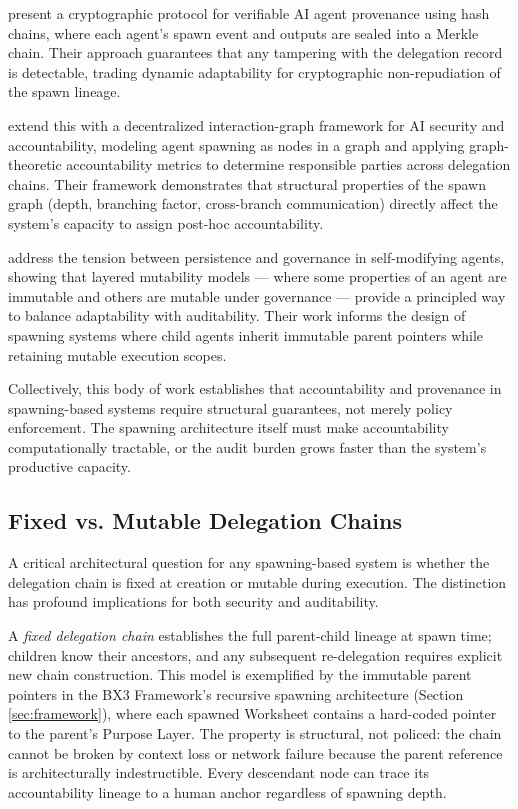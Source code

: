  present a cryptographic protocol for verifiable AI agent provenance using hash chains, where each agent's spawn event and outputs are sealed into a Merkle chain. Their approach guarantees that any tampering with the delegation record is detectable, trading dynamic adaptability for cryptographic non-repudiation of the spawn lineage.

 extend this with a decentralized interaction-graph framework for AI security and accountability, modeling agent spawning as nodes in a graph and applying graph-theoretic accountability metrics to determine responsible parties across delegation chains. Their framework demonstrates that structural properties of the spawn graph (depth, branching factor, cross-branch communication) directly affect the system's capacity to assign post-hoc accountability.

 address the tension between persistence and governance in self-modifying agents, showing that layered mutability models --- where some properties of an agent are immutable and others are mutable under governance --- provide a principled way to balance adaptability with auditability. Their work informs the design of spawning systems where child agents inherit immutable parent pointers while retaining mutable execution scopes.

Collectively, this body of work establishes that accountability and provenance in spawning-based systems require structural guarantees, not merely policy enforcement. The spawning architecture itself must make accountability computationally tractable, or the audit burden grows faster than the system's productive capacity.

\subsection{Fixed vs. Mutable Delegation Chains}

A critical architectural question for any spawning-based system is whether the delegation chain is fixed at creation or mutable during execution. The distinction has profound implications for both security and auditability.

A \emph{fixed delegation chain} establishes the full parent-child lineage at spawn time; children know their ancestors, and any subsequent re-delegation requires explicit new chain construction. This model is exemplified by the immutable parent pointers in the BX3 Framework's recursive spawning architecture (Section \ref{sec:framework}), where each spawned Worksheet contains a hard-coded pointer to the parent's Purpose Layer. The property is structural, not policed: the chain cannot be broken by context loss or network failure because the parent reference is architecturally indestructible. Every descendant node can trace its accountability lineage to a human anchor regardless of spawning depth.

